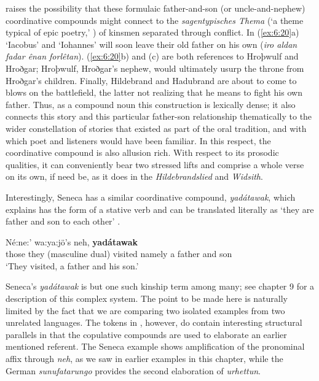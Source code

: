 \begin{sloppypar}
\noindent \citet{Schürr2013} raises the possibility that these formulaic father-and-son (or uncle-and-nephew) coordinative compounds might connect to the \textit{sagentypisches Thema} (‘a theme typical of epic poetry,’ \citeyear[68]{Schürr2013}) of kinsmen separated through conflict. In (\ref{ex:6:20}a) ‘Iacobus’ and ‘Iohannes’ will soon leave their old father on his own (\textit{iro aldan fadar ênan forlêtan}). (\ref{ex:6:20}b) and (c) are both references to Hroþwulf and Hroðgar; Hroþwulf, Hroðgar’s nephew, would ultimately usurp the throne from Hroðgar’s children. Finally, Hildebrand and Hadubrand are about to come to blows on the battlefield, the latter not realizing that he means to fight his own father. Thus, as a compound noun this construction is lexically dense; it also connects this story and this particular father-son relationship thematically to the wider constellation of stories that existed as part of the oral tradition, and with which poet and listeners would have been familiar. In this respect, the coordinative compound is also allusion rich. With respect to its prosodic qualities, it can conveniently bear two stressed lifts and comprise a whole verse on its own, if need be, as it does in the \textit{Hildebrandslied} and \textit{Widsith}.
\end{sloppypar}

Interestingly, Seneca has a similar coordinative compound, \textit{yadátawak}, which \citet[124]{Chafe2014} explains has the form of a stative verb and can be translated literally as ‘they are father and son to each other’ .

\ea%
    \label{ex:6:21}
\gll Né:ne:’  wa:ya:jö’s                      neh,   \textbf{yadátawak}\\
    those   {they (masculine dual) visited}   namely  {a father and son}\\
\glt `They visited, a father and his son.'
    \z

\noindent Seneca’s \textit{yadátawak} is but one such kinship term among many; see  chapter 9 for a description of this complex system. The point to be made here is naturally limited by the fact that we are comparing two isolated examples from two unrelated languages. The tokens in , however, do contain interesting structural parallels in that the copulative compounds are used to elaborate an earlier mentioned referent. The Seneca example shows amplification of the pronominal affix through \textit{neh}, as we saw in earlier examples in this chapter, while the German \textit{sunufatarungo} provides the second elaboration of \textit{urhettun}.

